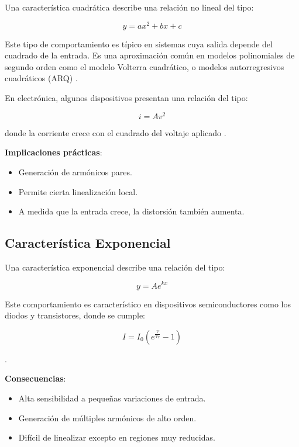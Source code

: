 Una característica cuadrática describe una relación no lineal del tipo:

\begin{equation}
    y = a x^2 + b x + c
\end{equation}

Este tipo de comportamiento es típico en sistemas cuya salida depende del cuadrado de la entrada. Es una aproximación común en modelos polinomiales de segundo orden como el modelo Volterra cuadrático, o modelos autorregresivos cuadráticos (ARQ) \cite{volterra_model}. 

En electrónica, algunos dispositivos presentan una relación del tipo:

\begin{equation}
    i = A v^2
\end{equation}

donde la corriente crece con el cuadrado del voltaje aplicado \cite{sedra_smith}.

\textbf{Implicaciones prácticas}:

\begin{itemize}
    \item Generación de armónicos pares.
    \item Permite cierta linealización local.
    \item A medida que la entrada crece, la distorsión también aumenta.
\end{itemize}

\subsection{Característica Exponencial}

Una característica exponencial describe una relación del tipo:

\begin{equation}
    y = A e^{k x}
\end{equation}

Este comportamiento es característico en dispositivos semiconductores como los diodos y transistores, donde se cumple:

\begin{equation}
    I = I_0 \left( e^{\frac{V}{V_T}} - 1 \right)
\end{equation}

\cite{sedra_smith, transistor_physics}.

\textbf{Consecuencias}:

\begin{itemize}
    \item Alta sensibilidad a pequeñas variaciones de entrada.
    \item Generación de múltiples armónicos de alto orden.
    \item Difícil de linealizar excepto en regiones muy reducidas.
\end{itemize}

